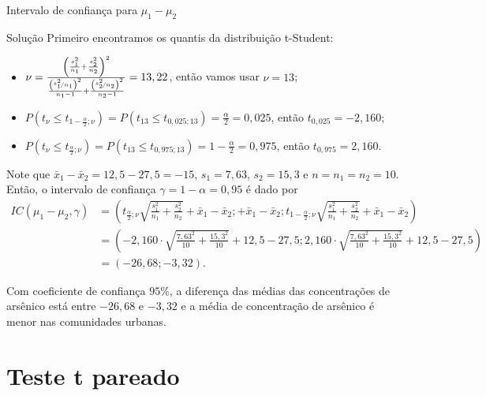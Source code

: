 \documentclass[9pt]{beamer}
\begin{document}
\begin{frame}{Intervalo de confiança para $\mu_1 - \mu_2$}

\footnotesize
\begin{block}{Solução}
Primeiro encontramos os quantis da distribuição t-Student:
\begin{itemize}
\item $\nu = \frac{\left( \frac{s_1^2}{n_1} + \frac{s_2^2}{n_2} \right)^2}{\frac{\left(\nicefrac{s_1^2}{n_1}\right)^2}{n_1-1} + \frac{\left(\nicefrac{s_2^2}{n_2}\right)^2}{n_2-1}} = 13,22$, então vamos usar $\nu=13$;
\item $P(t_{\nu} \leq t_{1-\frac{\alpha}{2}; \nu}) = P(t_{13} \leq t_{0,025; 13}) = \frac{\alpha}{2} = 0,025$, então $t_{0,025} =-2,160$;
\item $P(t_{\nu} \leq t_{\frac{\alpha}{2}; \nu}) = P(t_{13} \leq t_{0,975; 13}) =1- \frac{\alpha}{2} = 0,975$, então $t_{0,975} =2,160$.
\end{itemize}	

Note que $\bar{x}_1-\bar{x}_2 = 12,5 - 27,5 = -15$, $s_1 = 7,63$, $s_2 = 15,3$ e $n=n_1=n_2=10$. Então, o intervalo de confiança $\gamma=1-\alpha = 0,95$ é dado por
{\scriptsize
\begin{align*}
IC(\mu_1 - \mu_2, \gamma) &= \left( t_{\frac{\alpha}{2};\nu} \sqrt{\frac{s_1^2}{n_1} + \frac{s_2^2}{n_2}}   + \bar{x}_1- \bar{x}_2; + \bar{x}_1- \bar{x}_2; t_{1-\frac{\alpha}{2};\nu}  \sqrt{\frac{s_1^2}{n_1} + \frac{s_2^2}{n_2}} + \bar{x}_1- \bar{x}_2  \right)\\
&= \left( -2,160\cdot \sqrt{\frac{7,63^2}{10} + \frac{15,3^2}{10}} + 12,5 - 27,5; 2,160\cdot \sqrt{\frac{7,63^2}{10} + \frac{15,3^2}{10}} + 12,5 - 27,5  \right)\\
&= \left( -26,68; -3,32 \right).
\end{align*}
}

Com coeficiente de confiança $95\%$, a diferença das médias das concentrações de arsênico está entre $-26,68$ e $-3,32$ e  a média de concentração de arsênico é menor nas comunidades urbanas.
\end{block}
\normalsize

\end{frame}




\section{Teste t pareado}
\end{document}

